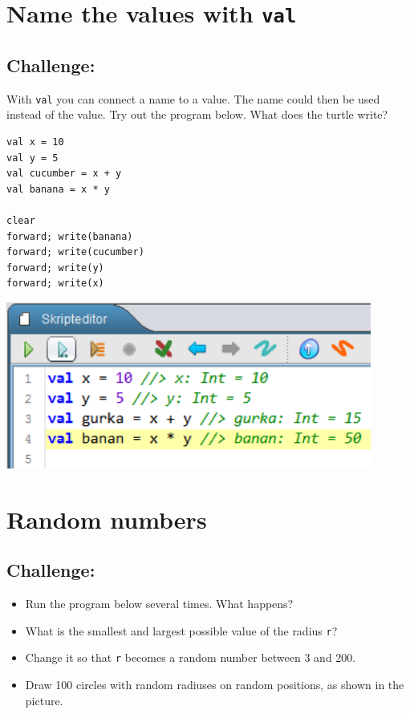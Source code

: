 \chapter{Name the values with \lstinline{val}}
\begin{multicols}{2}
\section*{\color{BrickRed}Challenge:}
With \lstinline{val} you can connect a name to a value. The name could then be used instead of the value. Try out the program below. What does the turtle write?

\begin{lstlisting}[numbers=none]
val x = 10
val y = 5
val cucumber = x + y
val banana = x * y

clear
forward; write(banana)
forward; write(cucumber)
forward; write(y)
forward; write(x)
\end{lstlisting}
        

\columnbreak

\begin{center}
\includegraphics[width=12.0cm]{../img/val.png}
\end{center}

\end{multicols}

\chapter{Random numbers}\section*{\color{BrickRed}Challenge:}


\begin{itemize}

\item {Run the program below several times. What happens?}
\item {What is the smallest and largest possible value of the radius \lstinline{r}?}
\item {Change it so that \lstinline{r} becomes a random number between 3 and 200.}
\item {Draw 100 circles with random radiuses on random positions, as shown in the picture.}

\end{itemize}



